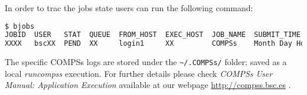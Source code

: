 In order to trac the jobs state users can run the following command:
\begin{lstlisting}[language=bash]
$ bjobs
JOBID  USER   STAT  QUEUE  FROM_HOST  EXEC_HOST  JOB_NAME  SUBMIT_TIME
XXXX   bscXX  PEND  XX     login1     XX         COMPSs    Month Day Hour
\end{lstlisting}

The specific COMPSs logs are stored under the \verb|~/.COMPSs/| folder; saved as a local \textit{runcompss} execution. For further 
details please check \textit{COMPSs User Manual: Application Execution} available at our webpage \url{http://compss.bsc.es} .
